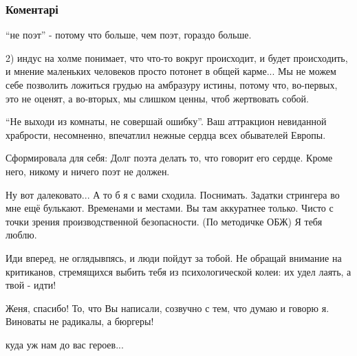  
 
 
 
 
\subsubsection{Коментарі}

\begin{itemize}

\enquote{не поэт} - потому что больше, чем поэт, гораздо больше.

2) индус на холме понимает, что что-то вокруг происходит, и будет происходить,
и мнение маленьких человеков просто потонет в общей карме... Мы не можем себе
позволить ложиться грудью на амбразуру истины, потому что, во-первых, это не
оценят, а во-вторых, мы слишком ценны, чтоб жертвовать собой.


\enquote{Не выходи из комнаты, не совершай ошибку}. Ваш аттракцион невиданной
храбрости, несомненно, впечатлил нежные сердца всех обывателей Европы.


Сформировала для себя:
Долг поэта делать то, что говорит его сердце. Кроме него, никому и ничего поэт не должен.


Ну вот далековато... А то б я с вами сходила. Поснимать. Задатки стрингера во
мне ещё булькают. Временами и местами. Вы там аккуратнее только. Чисто с точки
зрения производственной безопасности. (По методичке ОБЖ) Я тебя люблю.


Иди вперед, не оглядывпясь, и люди пойдут за тобой. Не обращай внимание на
критиканов, стремящихся выбить тебя из психологической колеи: их удел лаять, а
твой - идти!


Женя, спасибо! То, что Вы написали, созвучно с тем, что думаю и говорю я.
Виноваты не радикалы, а бюргеры!


куда уж нам до вас героев...


\end{itemize}
